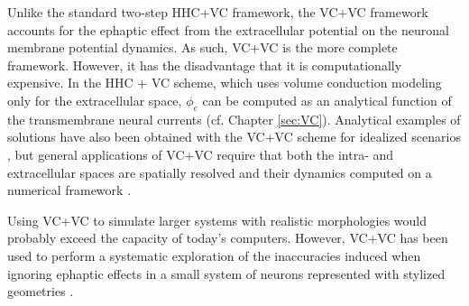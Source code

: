 Unlike the standard two-step HHC+VC framework, the VC+VC framework accounts for the ephaptic effect  from the extracellular potential on the neuronal membrane potential dynamics. As such, VC+VC is the more complete framework. However, it has the disadvantage that it is computationally expensive. In the HHC + VC scheme, which uses volume conduction modeling only for the extracellular space, $\phi_e$ can be computed as an analytical function of the transmembrane neural currents (cf. Chapter \ref{sec:VC}). Analytical examples of solutions have also been obtained with the VC+VC scheme for idealized scenarios 
 \citep{Krassowska1994}, but general applications of VC+VC require that both the intra- and extracellular spaces are spatially resolved and their dynamics computed on a numerical framework \citep{Agudelo-Toro2013, Tveito2017}. 

Using VC+VC to simulate larger systems with realistic morphologies would probably exceed the capacity of today's computers. However, VC+VC has been used to perform a systematic exploration of the inaccuracies induced when ignoring ephaptic effects in a small system of neurons represented with stylized geometries  \citep{Tveito2019}.





